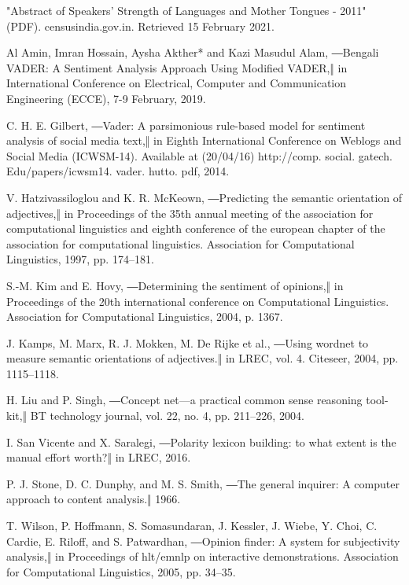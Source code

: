 \documentclass[conference]{IEEEtran}
\begin{document}
\begin{thebibliography}{00}
 "Abstract of Speakers' Strength of Languages and Mother Tongues - 2011" (PDF). censusindia.gov.in. Retrieved 15 February 2021.

 Al Amin, Imran Hossain, Aysha Akther* and Kazi Masudul Alam, ―Bengali VADER: A Sentiment Analysis Approach Using Modified VADER,‖ in International Conference on Electrical, Computer and Communication Engineering (ECCE), 7-9 February, 2019.

 C. H. E. Gilbert, ―Vader: A parsimonious rule-based model for sentiment analysis of social media text,‖ in Eighth International Conference on Weblogs and Social Media (ICWSM-14). Available at (20/04/16) http://comp. social. gatech. Edu/papers/icwsm14. vader. hutto. pdf, 2014.

 V. Hatzivassiloglou and K. R. McKeown, ―Predicting the semantic orientation of adjectives,‖ in Proceedings of the 35th annual meeting of the association for computational linguistics and eighth conference of the european chapter of the association for computational linguistics. Association for Computational Linguistics, 1997, pp. 174–181.

 S.-M. Kim and E. Hovy, ―Determining the sentiment of opinions,‖ in Proceedings of the 20th international conference on Computational Linguistics. Association for Computational Linguistics, 2004, p. 1367.

 J. Kamps, M. Marx, R. J. Mokken, M. De Rijke et al., ―Using wordnet to measure semantic orientations of adjectives.‖ in LREC, vol. 4. Citeseer, 2004, pp. 1115–1118.

 H. Liu and P. Singh, ―Concept net—a practical common sense reasoning tool-kit,‖ BT technology journal, vol. 22, no. 4, pp. 211–226, 2004.

 I. San Vicente and X. Saralegi, ―Polarity lexicon building: to what extent is the manual effort worth?‖ in LREC, 2016.

  P. J. Stone, D. C. Dunphy, and M. S. Smith, ―The general inquirer: A computer approach to content analysis.‖ 1966.

  T. Wilson, P. Hoffmann, S. Somasundaran, J. Kessler, J. Wiebe, Y. Choi, C. Cardie, E. Riloff, and S. Patwardhan, ―Opinion finder: A system for subjectivity analysis,‖ in Proceedings of hlt/emnlp on interactive demonstrations. Association for Computational Linguistics, 2005, pp. 34–35.


\end{thebibliography}
\end{document}
